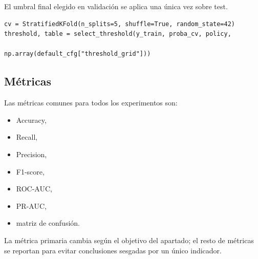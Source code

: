 El umbral final elegido en validación se aplica una única vez sobre test.

\begin{lstlisting}[caption={Protocolo resumido},label={lst:protocolo_resumido}]
cv = StratifiedKFold(n_splits=5, shuffle=True, random_state=42)
threshold, table = select_threshold(y_train, proba_cv, policy,
									np.array(default_cfg["threshold_grid"]))
\end{lstlisting}

\subsection{Métricas}

Las métricas comunes para todos los experimentos son:

\begin{itemize}
	\item Accuracy,
	\item Recall,
	\item Precision,
	\item F1-score,
	\item ROC-AUC,
	\item PR-AUC,
	\item matriz de confusión.
\end{itemize}

La métrica primaria cambia según el objetivo del apartado; el resto de métricas se reportan para evitar conclusiones sesgadas por un único indicador.
